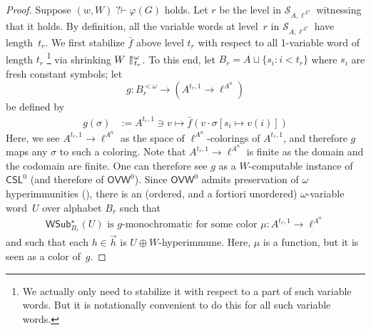 \documentclass{article}
\def\Sc{\mathcal{S}}
\newcommand{\qvdash}{\operatorname{{?}{\vdash}}}
\newcommand{\CSL}[0]{\mathsf{CSL}}
\newcommand{\OVW}[0]{\mathsf{OVW}}
\newcommand{\WSub}{\mathsf{WSub}}
\numberwithin{theorem}{section}
\theoremstyle{definition}
\newcommand{\upupharpoonright}{%
  \upharpoonright
  \mathrel{\mkern-4.5mu}%
  \upharpoonright
}
\newcommand{\uuh}{\upupharpoonright}
\begin{document}
\begin{proof}
Suppose $(w, W) \qvdash \varphi(G)$ holds. Let $r$ be the level in $\Sc_{A,\ell^{A^n}}$ witnessing that it holds.
By definition, all the variable words at level~$r$ in $\Sc_{A,\ell^{A^n}}$ have length~$t_r$. 
We first stabilize $\bar f$ above 
level $t_r$ with respect to all 1-variable word of length $t_r$
\footnote{We actually only need to stabilize it with respect to a part of such variable words.
But it is notationally convenient to do this for all such variable words.}
via shrinking $W \uuh_{t_r}^\omega$.
To this end,
let $B_r = A \sqcup \{ s_i : i < t_r \}$ where $s_i$ are fresh constant symbols;
let $$g : B_r^{<\omega} \to (A^{t_r,1} \to \ell^{A^n})$$ be defined by
\begin{align}\label{ccsl1-eq3}
g(\sigma) &:= A^{t_r,1} \ni v \mapsto \bar f(v \cdot \sigma[s_i \mapsto v(i)])
\end{align}
Here, we see $A^{t_r,1} \to \ell^{A^n}$ as the space of $\ell^{A^n}$-colorings of $A^{t_r,1}$, and therefore $g$ maps any $\sigma$ to such a coloring. Note that $A^{t_r,1} \to \ell^{A^n}$ is finite as the domain and the codomain are finite.
One can therefore see $g$ as a $W$-computable instance of $\CSL^0$ (and therefore of $\OVW^0$). Since $\OVW^0$ admits preservation of $\omega$ hyperimmunities (), there is an (ordered, and a fortiori unordered) $\omega$-variable word~$U$
over alphabet $B_r$ such that
\begin{align}\label{ccsl1-eq6}
\text{$\WSub^{\star}_{B_r}(U)$ is $g$-monochromatic for some color~$\mu : A^{t_r,1} \to \ell^{A^n}$}
\end{align}
and such that each $h \in \vec{h}$ is $U \oplus W$-hyperimmune. Here, $\mu$ is a function, but it is seen as a color of~$g$. %


\end{proof}
\end{document}
